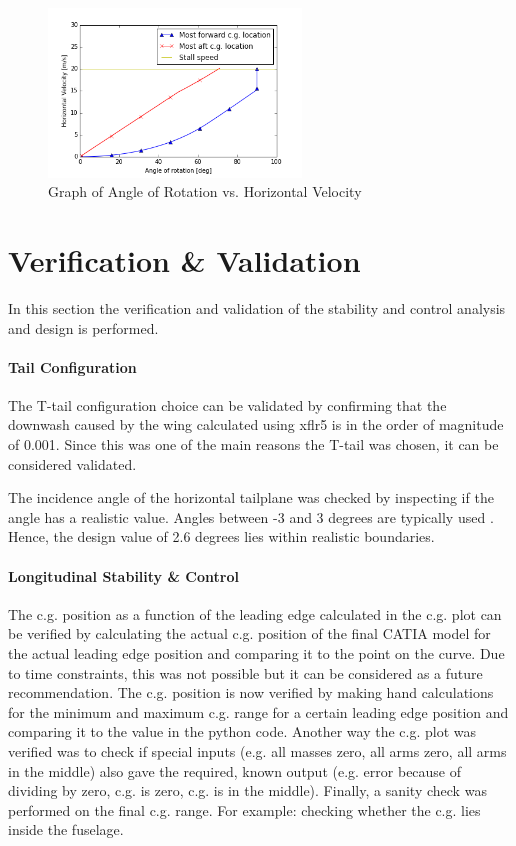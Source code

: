 \begin{figure}[H]
    \centering
    \includegraphics[width=0.6\textwidth]{StabilityandControl/Figures/transition.png}
    \caption{Graph of Angle of Rotation vs. Horizontal Velocity}
    \label{fig:tran_vert_to_hori}
\end{figure}

\section{Verification \& Validation}
\label{sec:veri_vali_snc}
In this section the verification and validation of the stability and control analysis and design is performed.

\paragraph{Tail Configuration}
The T-tail configuration choice can be validated by confirming that the downwash caused by the wing calculated using xflr5 is in the order of magnitude of 0.001. Since this was one of the main reasons the T-tail was chosen, it can be considered validated.

The incidence angle of the horizontal tailplane was checked by inspecting if the angle has a realistic value. Angles between -3 and 3 degrees are typically used \cite[67]{raymer}. Hence, the design value of 2.6 degrees lies within realistic boundaries.

\paragraph{Longitudinal Stability \& Control}
The c.g. position as a function of the leading edge calculated in the c.g. plot can be verified by calculating the actual c.g. position of the final CATIA model for the actual leading edge position and comparing it to the point on the curve. Due to time constraints, this was not possible but it can be considered as a future recommendation. The c.g. position is now verified by making hand calculations for the minimum and maximum c.g. range for a certain leading edge position and comparing it to the value in the python code. Another way the c.g. plot was verified was to check if special inputs (e.g. all masses zero, all arms zero, all arms in the middle) also gave the required, known output (e.g. error because of dividing by zero, c.g. is zero, c.g. is in the middle). Finally, a sanity check was performed on the final c.g. range. For example: checking whether the c.g. lies inside the fuselage.

